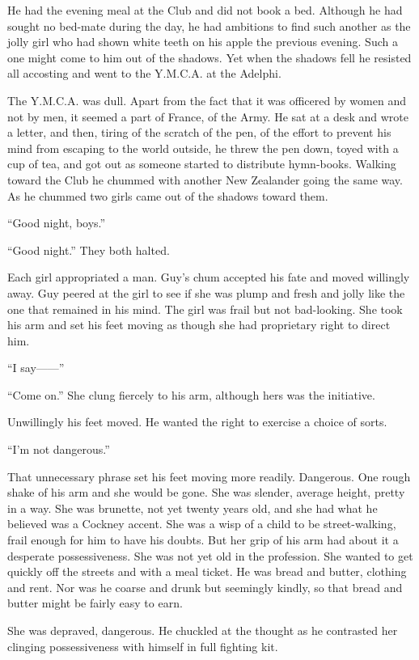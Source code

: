 He had the evening meal at the Club and did not book a bed. Although he had sought no bed-mate during the day, he had ambitions to find such another as the jolly girl who had shown white teeth on his apple the previous evening. Such a one might come to him out of the shadows. Yet when the shadows fell he resisted all accosting and went to the Y.M.C.A. at the Adelphi.

The Y.M.C.A. was dull. Apart from the fact that it was officered by women and not by men, it seemed a part of France,  of the Army. He sat at a desk and wrote a letter, and then, tiring of the scratch of the pen, of the effort to prevent his mind from escaping to the world outside, he threw the pen down, toyed with a cup of tea, and got out as someone started to distribute hymn-books. Walking toward the Club he chummed with another New Zealander going the same way. As he chummed two girls came out of the shadows toward them.

``Good night, boys.''

``Good night.'' They both halted.

Each girl appropriated a man. Guy's chum accepted his fate and moved willingly away. Guy peered at the girl to see if she was plump and fresh and jolly like the one that remained in his mind. The girl was frail but not bad-looking. She took his arm and set his feet moving as though she had proprietary right to direct him.

``I say------''

``Come on.'' She clung fiercely to his arm, although hers was the initiative.

Unwillingly his feet moved. He wanted the right to exercise a choice of sorts.

``I'm not dangerous.''

That unnecessary phrase set his feet moving more readily. Dangerous. One rough shake of his arm and she would be gone. She was slender, average height, pretty in a way. She was brunette, not yet twenty years old, and she had what he believed was a Cockney accent. She was a wisp of a child to be street-walking, frail enough for him to have his doubts. But her grip of his arm had about it a desperate possessiveness. She was not yet old in the profession. She wanted to get quickly off the streets and with a meal ticket. He was bread and butter, clothing and rent. Nor was he coarse and drunk but seemingly kindly, so that bread and butter might be fairly easy to earn.

She was depraved, dangerous. He chuckled at the thought as he contrasted her clinging possessiveness with himself in full fighting kit.

